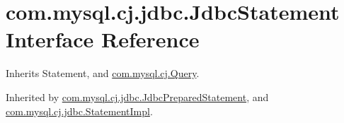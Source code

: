 \hypertarget{interfacecom_1_1mysql_1_1cj_1_1jdbc_1_1_jdbc_statement}{}\section{com.\+mysql.\+cj.\+jdbc.\+Jdbc\+Statement Interface Reference}
\label{interfacecom_1_1mysql_1_1cj_1_1jdbc_1_1_jdbc_statement}


Inherits Statement, and \mbox{\hyperlink{interfacecom_1_1mysql_1_1cj_1_1_query}{com.\+mysql.\+cj.\+Query}}.



Inherited by \mbox{\hyperlink{interfacecom_1_1mysql_1_1cj_1_1jdbc_1_1_jdbc_prepared_statement}{com.\+mysql.\+cj.\+jdbc.\+Jdbc\+Prepared\+Statement}}, and \mbox{\hyperlink{classcom_1_1mysql_1_1cj_1_1jdbc_1_1_statement_impl}{com.\+mysql.\+cj.\+jdbc.\+Statement\+Impl}}.

